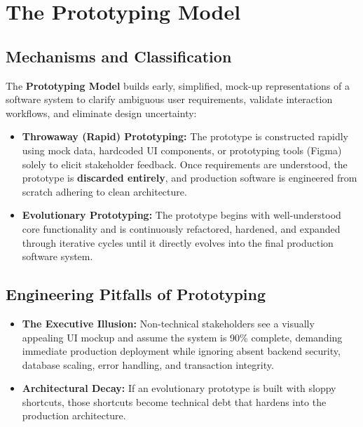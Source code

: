 \section{The Prototyping Model}
\label{sec:se_prototyping}

\subsection{Mechanisms and Classification}
The \textbf{Prototyping Model} builds early, simplified, mock-up representations of a software system to clarify ambiguous user requirements, validate interaction workflows, and eliminate design uncertainty:
\begin{itemize}
    \item \textbf{Throwaway (Rapid) Prototyping:} The prototype is constructed rapidly using mock data, hardcoded UI components, or prototyping tools (Figma) solely to elicit stakeholder feedback. Once requirements are understood, the prototype is \textbf{discarded entirely}, and production software is engineered from scratch adhering to clean architecture.
    \item \textbf{Evolutionary Prototyping:} The prototype begins with well-understood core functionality and is continuously refactored, hardened, and expanded through iterative cycles until it directly evolves into the final production software system.
\end{itemize}

\subsection{Engineering Pitfalls of Prototyping}
\begin{itemize}
    \item \textbf{The Executive Illusion:} Non-technical stakeholders see a visually appealing UI mockup and assume the system is 90\% complete, demanding immediate production deployment while ignoring absent backend security, database scaling, error handling, and transaction integrity.
    \item \textbf{Architectural Decay:} If an evolutionary prototype is built with sloppy shortcuts, those shortcuts become technical debt that hardens into the production architecture.
\end{itemize}

